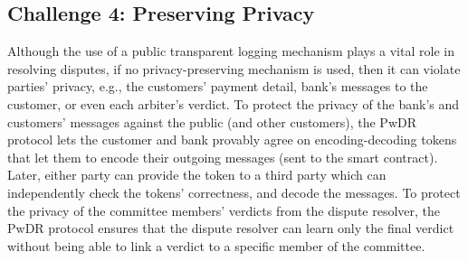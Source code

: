 
\subsection{Challenge 4: Preserving Privacy}
 Although the use of a public transparent logging mechanism plays a vital role in resolving disputes, if no  privacy-preserving mechanism is used, then it can violate parties' privacy, e.g., the customers' payment detail,  bank's messages to the customer, or even each arbiter's verdict. To protect the  privacy of the bank's and customers' messages against the public (and other customers), the PwDR protocol lets the customer and bank provably agree on encoding-decoding tokens that let them to encode their outgoing messages (sent to the smart contract). Later, either party can provide the token to a third party which can independently check the tokens' correctness, and decode the messages. To protect the privacy of the committee members' verdicts from the  dispute resolver, the PwDR protocol ensures that  the dispute resolver can learn only the final verdict without being able to link a verdict to a specific  member of the committee. 